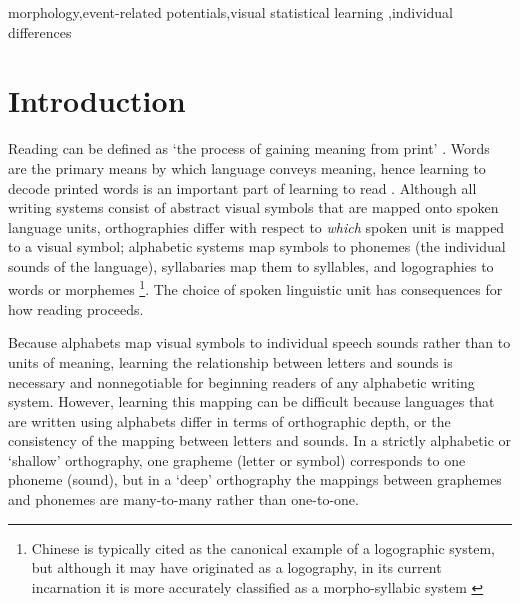 \documentclass[review]{elsarticle}
\begin{document}
\begin{frontmatter}

\begin{keyword}
 morphology\sep event-related potentials\sep visual statistical learning \sep individual differences
\end{keyword}

\end{frontmatter}

\linenumbers

\section{Introduction}

Reading can be defined as `the process of gaining meaning from print' \citep[][p. 34]{raynerHowPsychologicalScience2001}. Words are the primary means by which language conveys meaning, hence learning to decode printed words is an important part of learning to read \citep[e.g.,][]{castlesEndingReadingWars2018}.  Although all writing systems consist of abstract visual symbols that are mapped onto spoken language units, orthographies differ with respect to \textit{which} spoken unit is mapped to a visual symbol; alphabetic systems map symbols to phonemes (the individual sounds of the language), syllabaries  map them to syllables, and logographies to words or morphemes \footnote{Chinese is typically cited as the canonical example of a logographic system, but although it may have originated as a logography, in its current incarnation it is more accurately classified as a morpho-syllabic system \citep{raynerHowPsychologicalScience2001}}.  The choice of spoken linguistic unit has consequences for how reading proceeds. %

Because alphabets map visual symbols to individual speech sounds rather than to units of meaning,  learning the relationship between letters and sounds is necessary and nonnegotiable for beginning readers of any alphabetic writing system. However, learning this mapping can be difficult because languages that are written using alphabets differ in terms of orthographic depth, or the consistency of the mapping between letters and sounds. In a strictly alphabetic or ‘shallow’ orthography, one grapheme (letter or symbol) corresponds to one phoneme (sound), but in a ‘deep’ orthography the mappings between graphemes and phonemes  are many-to-many rather than one-to-one.
\end{document}
